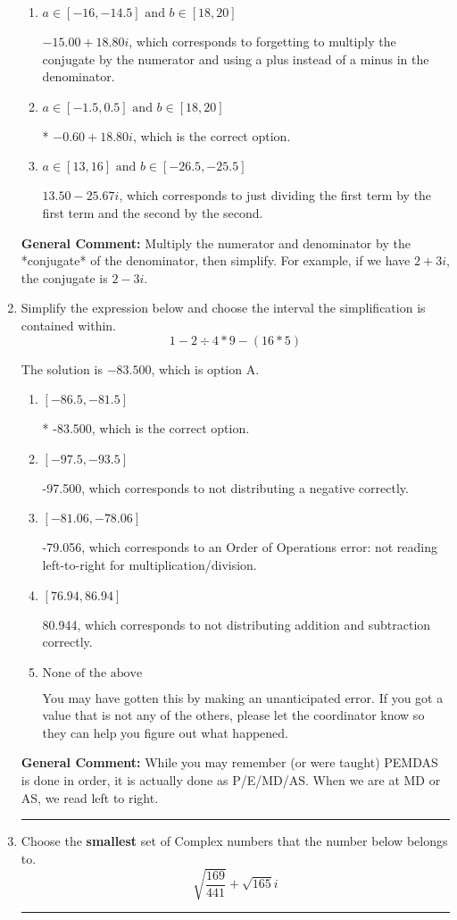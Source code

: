 \documentclass{extbook}[14pt]
\newcommand{\litem}[1]{\item #1

\rule{\textwidth}{0.4pt}}
\begin{document}
\begin{enumerate}
{\begin{enumerate}[label=\Alph*.]
 $-0.60  + 470.00 i$, which corresponds to forgetting to multiply the conjugate by the numerator.
\item \( a \in [-16, -14.5] \text{ and } b \in [18, 20] \)

 $-15.00  + 18.80 i$, which corresponds to forgetting to multiply the conjugate by the numerator and using a plus instead of a minus in the denominator.
\item \( a \in [-1.5, 0.5] \text{ and } b \in [18, 20] \)

* $-0.60  + 18.80 i$, which is the correct option.
\item \( a \in [13, 16] \text{ and } b \in [-26.5, -25.5] \)

 $13.50  - 25.67 i$, which corresponds to just dividing the first term by the first term and the second by the second.
\end{enumerate}

\textbf{General Comment:} Multiply the numerator and denominator by the *conjugate* of the denominator, then simplify. For example, if we have $2+3i$, the conjugate is $2-3i$.
}
\litem{
Simplify the expression below and choose the interval the simplification is contained within.
\[ 1 - 2 \div 4 * 9 - (16 * 5) \]

The solution is \( -83.500 \), which is option A.\begin{enumerate}[label=\Alph*.]
\item \( [-86.5, -81.5] \)

* -83.500, which is the correct option.
\item \( [-97.5, -93.5] \)

 -97.500, which corresponds to not distributing a negative correctly.
\item \( [-81.06, -78.06] \)

 -79.056, which corresponds to an Order of Operations error: not reading left-to-right for multiplication/division.
\item \( [76.94, 86.94] \)

 80.944, which corresponds to not distributing addition and subtraction correctly.
\item \( \text{None of the above} \)

 You may have gotten this by making an unanticipated error. If you got a value that is not any of the others, please let the coordinator know so they can help you figure out what happened.
\end{enumerate}

\textbf{General Comment:} While you may remember (or were taught) PEMDAS is done in order, it is actually done as P/E/MD/AS. When we are at MD or AS, we read left to right.
}
\litem{
Choose the \textbf{smallest} set of Complex numbers that the number below belongs to.
\[ \sqrt{\frac{169}{441}}+\sqrt{165} i \]

}
\end{enumerate}
\end{document}
